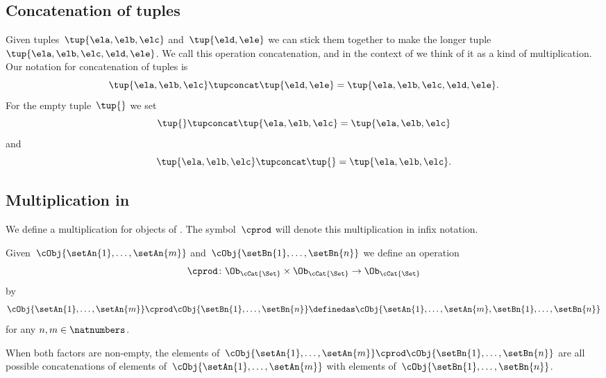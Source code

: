 \subsection{Concatenation of tuples}

Given tuples~$\tup{\ela, \elb, \elc}$ and~$\tup{\eld, \ele}$ we can stick them together to make the longer tuple~$\tup{\ela, \elb, \elc, \eld, \ele}$.
We call this operation concatenation, and in the context of \cCat{\Set} we think of it as a kind of multiplication.
Our notation for concatenation of tuples is
\begin{equation*}
    \tup{\ela, \elb, \elc} \tupconcat \tup{\eld, \ele} = \tup{\ela, \elb, \elc, \eld, \ele}.
\end{equation*}
For the empty tuple~$\tup{  }$ we set
\begin{equation*}
    \tup{} \tupconcat \tup{\ela, \elb, \elc}  = \tup{\ela, \elb, \elc}
\end{equation*}
and
\begin{equation*}
    \tup{\ela, \elb, \elc}  \tupconcat \tup{ } = \tup{\ela, \elb, \elc}.
\end{equation*}

\subsection{Multiplication in \cCat{\Set}}

We define a multiplication for objects of \cCat{\Set}.
The symbol~$\cprod$ will denote this multiplication in infix notation.

Given~$\cObj{\setAn{1}, \ldots, \setAn{m}}$ and~$\cObj{\setBn{1},  \ldots, \setBn{n}}$ we define
an operation
\begin{equation*}
\cprod \colon \Ob_{\cCat{\Set}} \times \Ob_{\cCat{\Set}} \to \Ob_{\cCat{\Set}}
\end{equation*}
by 
\begin{equation}
    \label{eq:strict-monoidal-product-sets}
    \cObj{\setAn{1}, \ldots, \setAn{m}} \cprod \cObj{\setBn{1}, \ldots, \setBn{n}} \definedas \cObj{\setAn{1}, \ldots, \setAn{m}, \setBn{1},  \ldots, \setBn{n}}
\end{equation}
for any $n, m \in \natnumbers$. 


When both factors are non-empty, the elements of~$\cObj{\setAn{1}, \ldots, \setAn{m}} \cprod \cObj{\setBn{1}, \ldots, \setBn{n}}$ are all possible concatenations of elements of~$\cObj{\setAn{1}, \ldots, \setAn{m}}$ with elements of~$\cObj{\setBn{1}, \ldots, \setBn{n}}$.

